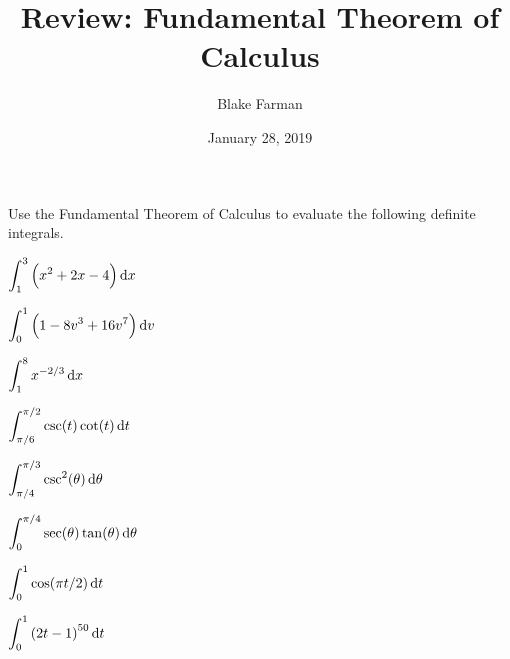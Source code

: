 \documentclass[10pt]{amsart}
\title{Review: Fundamental Theorem of Calculus}
\date{January 28, 2019}
\author{Blake Farman}
\begin{document}
\maketitle

\makenameslot

Use the Fundamental Theorem of Calculus to evaluate the following definite integrals.
\begin{multicols}{2}
  \begin{thm}
    \(\displaystyle{\int_1^3 \left(x^2 + 2x - 4\right)\dif x}\)
  \end{thm}

  \begin{thm}
    \(\displaystyle{\int_0^1 \left(1 - 8v^3 + 16v^7\right) \dif v}\)
  \end{thm}
\end{multicols}

\vspace{2.5in}

\begin{multicols}{2}
  \begin{thm}
    \(\displaystyle{\int_1^8 x^{-2/3}\dif x}\)
  \end{thm}
  
  \begin{thm}
    \(\displaystyle{\int_{\pi/6}^{\pi/2} \csc(t)\cot(t)\dif t}\)
  \end{thm}
\end{multicols}

\newpage
\begin{multicols}{2}
  \begin{thm}
    \(\displaystyle{\int_{\pi/4}^{\pi/3} \csc^2(\theta)\dif\theta}\)
  \end{thm}

  \begin{thm}
    \(\displaystyle{\int_0^{\pi/4} \sec(\theta)\tan(\theta)\dif\theta}\)
  \end{thm}
\end{multicols}

\vspace{2.5in}

\begin{multicols}{2}
  \begin{thm}
    \(\displaystyle{\int_0^1\cos(\pi t/2)\dif t}\)
  \end{thm}

  \begin{thm}
    \(\displaystyle{\int_0^1 \left(2t - 1\right)^{50} \dif t}\)
  \end{thm}
\end{multicols}
\end{document}
